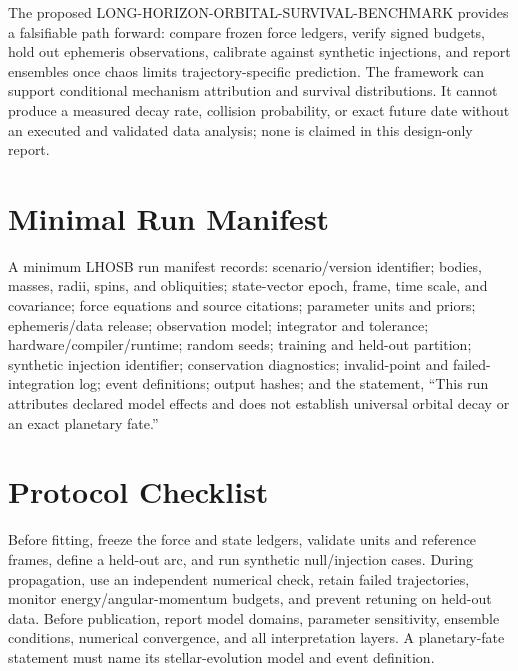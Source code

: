\documentclass[10pt,conference]{IEEEtran}
\begin{document}
The proposed LONG-HORIZON-ORBITAL-SURVIVAL-BENCHMARK provides a falsifiable path forward: compare frozen force ledgers, verify signed budgets, hold out ephemeris observations, calibrate against synthetic injections, and report ensembles once chaos limits trajectory-specific prediction. The framework can support conditional mechanism attribution and survival distributions. It cannot produce a measured decay rate, collision probability, or exact future date without an executed and validated data analysis; none is claimed in this design-only report.

\appendices
\section{Minimal Run Manifest}
\label{app:manifest}

A minimum LHOSB run manifest records: scenario/version identifier; bodies, masses, radii, spins, and obliquities; state-vector epoch, frame, time scale, and covariance; force equations and source citations; parameter units and priors; ephemeris/data release; observation model; integrator and tolerance; hardware/compiler/runtime; random seeds; training and held-out partition; synthetic injection identifier; conservation diagnostics; invalid-point and failed-integration log; event definitions; output hashes; and the statement, ``This run attributes declared model effects and does not establish universal orbital decay or an exact planetary fate.''

\section{Protocol Checklist}
\label{app:checklist}

Before fitting, freeze the force and state ledgers, validate units and reference frames, define a held-out arc, and run synthetic null/injection cases. During propagation, use an independent numerical check, retain failed trajectories, monitor energy/angular-momentum budgets, and prevent retuning on held-out data. Before publication, report model domains, parameter sensitivity, ensemble conditions, numerical convergence, and all interpretation layers. A planetary-fate statement must name its stellar-evolution model and event definition.
\end{document}
